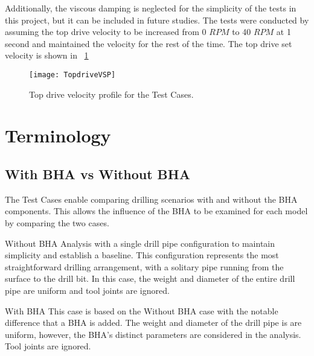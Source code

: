 Additionally, the viscous damping is neglected for the simplicity of the tests in this project, but it can be included in future studies.  The tests were conducted by assuming the top drive velocity to be increased from 0 $RPM$ to 40 $RPM$ at 1 second and maintained the velocity for the rest of the time. The top drive set velocity is shown in \figurename~\ref{figure_topdrive_VSP}
\begin{figure}
  \centering
  \texttt{[image: TopdriveVSP]}
  \caption[Top drive velocity profile for the Test Cases]{Top drive velocity profile for the Test Cases.}\label{figure_topdrive_VSP}
\end{figure}

\section{Terminology}
\subsection{With BHA vs Without BHA}
The Test Cases enable comparing drilling scenarios with and without the BHA components. This allows the influence of the BHA to be examined for each model by comparing the two cases.

\begin{definition}{Without BHA}
Analysis with a single drill pipe configuration to maintain simplicity and establish a baseline. This configuration represents the most straightforward drilling arrangement, with a solitary pipe running from the surface to the drill bit. In this case, the weight and diameter of the entire drill pipe are uniform and tool joints are ignored.
\end{definition}
\begin{definition}{With BHA}
This case is based on the Without BHA case with the notable difference that a BHA is added.  The weight and diameter of the drill pipe is are uniform, however, the BHA's distinct parameters are considered in the analysis.  Tool joints are ignored.
\end{definition}


